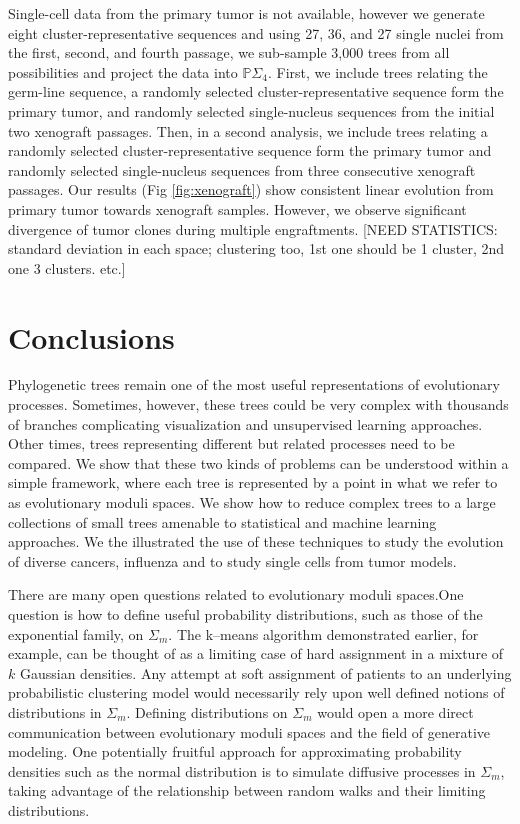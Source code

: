 \documentclass[a4paper,11pt]{article}
\begin{document}
Single-cell data from the primary tumor is not available, however we generate eight cluster-representative sequences and using 27, 36, and 27 single nuclei from the first, second, and fourth passage, we sub-sample 3,000 trees from all possibilities and project the data into $\mathbb{P}\Sigma_4 $.
First, we include trees relating the germ-line sequence, a randomly selected cluster-representative sequence form the primary tumor, and randomly selected single-nucleus sequences from the initial two xenograft passages.
Then, in a second analysis, we include trees relating a randomly selected cluster-representative sequence form the primary tumor and randomly selected single-nucleus sequences from three consecutive xenograft passages.
Our results (Fig \ref{fig:xenograft}) show consistent linear evolution from primary tumor towards xenograft samples.
However, we observe significant divergence of tumor clones during multiple engraftments. [NEED STATISTICS: standard deviation in each space; clustering too, 1st one should be 1 cluster, 2nd one 3 clusters. etc.]


\section{Conclusions}\label{sec:conclusions}

Phylogenetic trees remain one of the most useful representations of evolutionary processes. Sometimes, however, these trees could be very complex with thousands of branches complicating visualization and unsupervised learning approaches. Other times, trees representing different but related processes need to be compared. We show that these two kinds of problems can be understood within a simple framework, where each tree is represented by a point in what we refer to as evolutionary moduli spaces. We show how to reduce complex trees to a large collections of small trees amenable to statistical and machine learning approaches. We the illustrated the use of these techniques to study the evolution of diverse cancers, influenza and to study single cells from tumor models.

There are many open questions related to evolutionary moduli spaces.One question is how to define useful probability distributions, such as those of the exponential family, on $\Sigma_m$.
The k--means algorithm demonstrated earlier, for example, can be thought of as a limiting case of hard assignment in a mixture of $k$ Gaussian densities.
Any attempt at soft assignment of patients to an underlying probabilistic clustering model would necessarily rely upon well defined notions of distributions in $\Sigma_m$.
Defining distributions on $\Sigma_m$ would open a more direct communication between evolutionary moduli spaces and the field of generative modeling.
One potentially fruitful approach for approximating probability densities such as the normal distribution is to simulate diffusive processes in $\Sigma_m$, taking advantage of the relationship between random walks and their limiting distributions.
\end{document}
